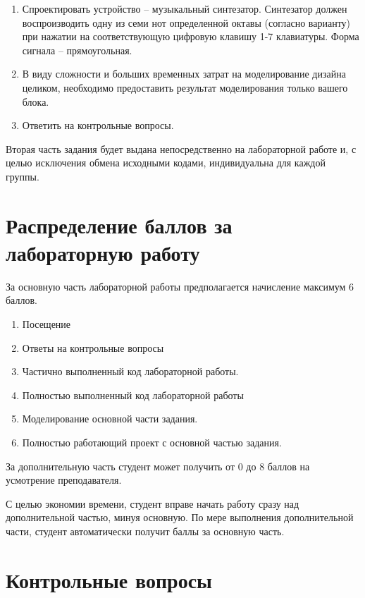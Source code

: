 \begin{enumerate}
	\item Спроектировать устройство -- музыкальный синтезатор. Синтезатор должен воспроизводить одну из семи нот определенной октавы (согласно варианту) при нажатии на соответствующую цифровую клавишу 1-7 клавиатуры. Форма сигнала -- прямоугольная.
	\item В виду сложности и больших временных затрат на моделирование дизайна целиком, необходимо предоставить результат моделирования только вашего блока.
	\item Ответить на контрольные вопросы.
\end{enumerate}



Вторая часть задания будет выдана непосредственно на лабораторной работе и, с целью исключения обмена исходными кодами, индивидуальна для каждой группы.

\section{Распределение баллов за лабораторную работу}

За основную часть лабораторной работы предполагается начисление максимум 6 баллов.

\begin{enumerate}
\item Посещение
\item Ответы на контрольные вопросы
\item Частично выполненный код лабораторной работы.
\item Полностью выполненный код лабораторной работы
\item Моделирование основной части задания.
\item Полностью работающий проект с основной частью задания.

\end{enumerate}

За дополнительную часть студент может получить от 0 до 8 баллов на усмотрение преподавателя.

С целью экономии времени, студент вправе начать работу сразу над дополнительной частью, минуя основную. По мере выполнения дополнительной части, студент автоматически получит баллы за основную часть.

\section{Контрольные вопросы}

